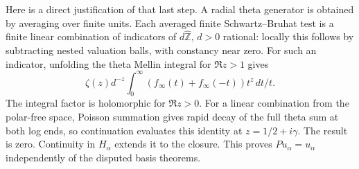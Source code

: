 \documentclass[11pt]{article}
\newcommand{\Z}{\mathbb Z}\newcommand{\A}{\mathbb A}
\begin{document}
Here is a direct justification of that last step. A radial theta generator is obtained by averaging over finite units. Each averaged finite Schwartz--Bruhat test is a finite linear combination of indicators of \(d\widehat{\Z}\), \(d>0\) rational: locally this follows by subtracting nested valuation balls, with constancy near zero. For such an indicator, unfolding the theta Mellin integral for \(\Re z>1\) gives
\[
       \zeta(z)d^{-z}\int_0^\infty(f_\infty(t)+f_\infty(-t))t^z\,dt/t .
\]
The integral factor is holomorphic for \(\Re z>0\). For a linear combination from the polar-free space, Poisson summation gives rapid decay of the full theta sum at both log ends, so continuation evaluates this identity at \(z=1/2+i\gamma\). The result is zero. Continuity in \(H_\alpha\) extends it to the closure. This proves \(Pu_\alpha=u_\alpha\) independently of the disputed basis theorems.
\end{document}
